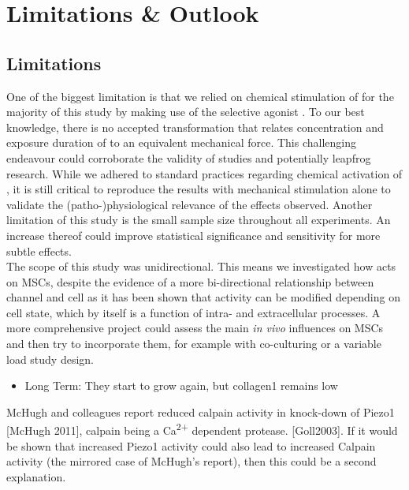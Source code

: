 \chapter{Limitations \& Outlook}

\section{Limitations}
One of the biggest limitation is that we relied on chemical stimulation of \Piezo{} for the majority of this study by making use of the selective \Piezo{} agonist \Yoda{}. To our best knowledge, there is no accepted transformation that relates concentration and exposure duration of \Yoda{} to an equivalent mechanical force. This challenging endeavour could corroborate the validity of \Yoda{} studies and potentially leapfrog \Piezo{} research. While we adhered to standard practices regarding chemical activation of \Piezo{}, it is still critical to reproduce the results with mechanical stimulation alone to validate the (patho-)physiological relevance of the effects observed. 
Another limitation of this study is the small sample size throughout all experiments. An increase thereof could improve statistical significance and sensitivity for more subtle effects.\\
The scope of this study was unidirectional. This means we investigated how \Piezo{} acts on MSCs, despite the evidence of a more bi-directional relationship between channel and cell as it has been shown that \Piezo{} activity can be modified depending on cell state, which by itself is a function of intra- and extracellular processes. A more comprehensive project could assess the main \textit{in vivo} influences on MSCs and then try to incorporate them, for example with co-culturing or a variable load study design.


\begin{itemize}
    \item Long Term: They start to grow again, but collagen1 remains low

\end{itemize}

McHugh and colleagues report reduced calpain activity in knock-down of Piezo1 [McHugh 2011], calpain being a Ca\textsuperscript{2+} dependent protease. [Goll2003]. If it would be shown that increased Piezo1 activity could also lead to increased Calpain activity (the mirrored case of McHugh's report), then this could be a second explanation.